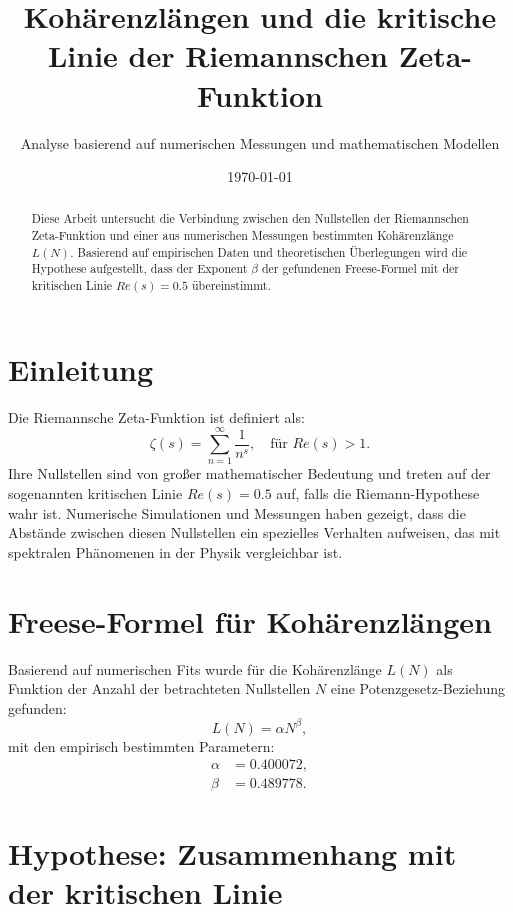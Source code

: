 \documentclass[a4paper,11pt]{article}
\title{Kohärenzlängen und die kritische Linie der Riemannschen Zeta-Funktion}
\author{Analyse basierend auf numerischen Messungen und mathematischen Modellen}
\date{\today}
\begin{document}
\maketitle

\begin{abstract}
Diese Arbeit untersucht die Verbindung zwischen den Nullstellen der Riemannschen Zeta-Funktion und einer aus numerischen Messungen bestimmten Kohärenzlänge \( L(N) \). Basierend auf empirischen Daten und theoretischen Überlegungen wird die Hypothese aufgestellt, dass der Exponent \( \beta \) der gefundenen Freese-Formel mit der kritischen Linie \( Re(s) = 0.5 \) übereinstimmt.
\end{abstract}

\section{Einleitung}

Die Riemannsche Zeta-Funktion ist definiert als:
\begin{equation}
\zeta(s) = \sum_{n=1}^{\infty} \frac{1}{n^s}, \quad \text{für } Re(s) > 1.
\end{equation}
Ihre Nullstellen sind von großer mathematischer Bedeutung und treten auf der sogenannten kritischen Linie \( Re(s) = 0.5 \) auf, falls die Riemann-Hypothese wahr ist. Numerische Simulationen und Messungen haben gezeigt, dass die Abstände zwischen diesen Nullstellen ein spezielles Verhalten aufweisen, das mit spektralen Phänomenen in der Physik vergleichbar ist.

\section{Freese-Formel für Kohärenzlängen}

Basierend auf numerischen Fits wurde für die Kohärenzlänge \( L(N) \) als Funktion der Anzahl der betrachteten Nullstellen \( N \) eine Potenzgesetz-Beziehung gefunden:
\begin{equation}
L(N) = \alpha N^\beta,
\end{equation}
mit den empirisch bestimmten Parametern:
\begin{align}
\alpha &= 0.400072, \\
\beta &= 0.489778.
\end{align}

\section{Hypothese: Zusammenhang mit der kritischen Linie}
\end{document}
